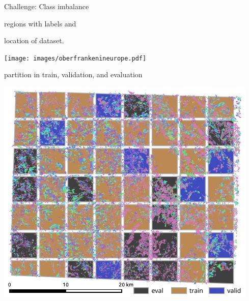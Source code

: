 \documentclass[a0]{tumposter}
\begin{document}
\begin{minipage}[t]{.65\textwidth}
\begin{minipage}[t]{.49\textwidth}
\begin{minipage}{.6\textwidth}
		\vspace{1em}
	
		\tiny Challenge: Class imbalance \par
		
	\end{minipage}
	\begin{minipage}{.35\textwidth}
%		
		\tiny {\color{tumblue}regions with labels} and \\ {\color{tumorange} location of dataset. \par} \par
		\texttt{[image: images/oberfrankenineurope.pdf]}
		 
		 \tiny partition in {\color{traincolor} train}, {\color{validcolor} validation}, and {\color{evalcolor} evaluation} \par
		\includegraphics[width=.9\textwidth]{images/holl.pdf}
	\end{minipage}
	
	\end{minipage}

\end{minipage}
\hfill
\end{document}
